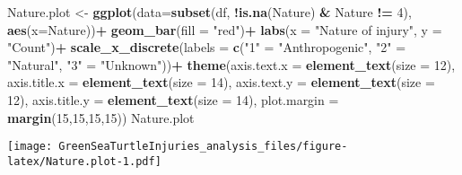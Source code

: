 \documentclass[
]{article}
\newenvironment{Shaded}{\begin{snugshade}}{\end{snugshade}}
\newcommand{\AttributeTok}[1]{\textcolor[rgb]{0.13,0.29,0.53}{#1}}
\newcommand{\CommentTok}[1]{\textcolor[rgb]{0.56,0.35,0.01}{\textit{#1}}}
\newcommand{\DecValTok}[1]{\textcolor[rgb]{0.00,0.00,0.81}{#1}}
\newcommand{\FunctionTok}[1]{\textcolor[rgb]{0.13,0.29,0.53}{\textbf{#1}}}
\newcommand{\NormalTok}[1]{#1}
\newcommand{\OtherTok}[1]{\textcolor[rgb]{0.56,0.35,0.01}{#1}}
\newcommand{\SpecialCharTok}[1]{\textcolor[rgb]{0.81,0.36,0.00}{\textbf{#1}}}
\newcommand{\StringTok}[1]{\textcolor[rgb]{0.31,0.60,0.02}{#1}}
\begin{document}
\begin{Shaded}
\begin{Highlighting}[]
\NormalTok{Nature.plot }\OtherTok{\textless{}{-}} \FunctionTok{ggplot}\NormalTok{(}\AttributeTok{data=}\FunctionTok{subset}\NormalTok{(df, }\SpecialCharTok{!}\FunctionTok{is.na}\NormalTok{(Nature) }\SpecialCharTok{\&}\NormalTok{ Nature }\SpecialCharTok{!=} \DecValTok{4}\NormalTok{), }\FunctionTok{aes}\NormalTok{(}\AttributeTok{x=}\NormalTok{Nature))}\SpecialCharTok{+}
  \FunctionTok{geom\_bar}\NormalTok{(}\AttributeTok{fill =} \StringTok{"red"}\NormalTok{)}\SpecialCharTok{+}
  \FunctionTok{labs}\NormalTok{(}\AttributeTok{x =} \StringTok{"Nature of injury"}\NormalTok{, }
       \AttributeTok{y =} \StringTok{"Count"}\NormalTok{)}\SpecialCharTok{+}
  \FunctionTok{scale\_x\_discrete}\NormalTok{(}\AttributeTok{labels =} \FunctionTok{c}\NormalTok{(}\StringTok{"1"} \OtherTok{=} \StringTok{"Anthropogenic"}\NormalTok{,}
                              \StringTok{"2"} \OtherTok{=} \StringTok{"Natural"}\NormalTok{,}
                              \StringTok{"3"} \OtherTok{=} \StringTok{"Unknown"}\NormalTok{))}\SpecialCharTok{+}
  \FunctionTok{theme}\NormalTok{(}\AttributeTok{axis.text.x =} \FunctionTok{element\_text}\NormalTok{(}\AttributeTok{size =} \DecValTok{12}\NormalTok{),}
          \AttributeTok{axis.title.x =} \FunctionTok{element\_text}\NormalTok{(}\AttributeTok{size =} \DecValTok{14}\NormalTok{),}
          \AttributeTok{axis.text.y =} \FunctionTok{element\_text}\NormalTok{(}\AttributeTok{size =} \DecValTok{12}\NormalTok{),}
          \AttributeTok{axis.title.y =} \FunctionTok{element\_text}\NormalTok{(}\AttributeTok{size =} \DecValTok{14}\NormalTok{),}
          \AttributeTok{plot.margin =} \FunctionTok{margin}\NormalTok{(}\DecValTok{15}\NormalTok{,}\DecValTok{15}\NormalTok{,}\DecValTok{15}\NormalTok{,}\DecValTok{15}\NormalTok{))}
\NormalTok{Nature.plot}
\end{Highlighting}
\end{Shaded}

\texttt{[image: GreenSeaTurtleInjuries\_analysis\_files/figure-latex/Nature.plot-1.pdf]}

\begin{Shaded}
\end{Shaded}
\end{document}
